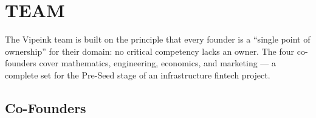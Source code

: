 \documentclass[11pt,a4paper]{article}
\begin{document}
\FloatBarrier
\section{TEAM}

The Vipeink team is built on the principle that every founder is a ``single point of ownership'' for their domain: no critical competency lacks an owner. The four co-founders cover mathematics, engineering, economics, and marketing --- a complete set for the Pre-Seed stage of an infrastructure fintech project.

\subsection*{Co-Founders}
\end{document}
